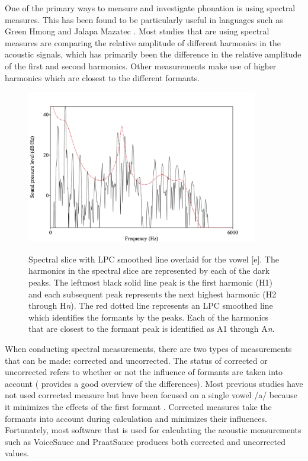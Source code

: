 \documentclass[12pt, letterpaper]{article}
\begin{document}
One of the primary ways to measure and investigate phonation is using spectral measures. This has been found to be particularly useful in languages such as Green Hmong \citep{huffmanMeasuresPhonationType1987,andruskiPhonationTypesProduction2000} and Jalapa Mazatec \citep{silvermanPhoneticStructuresJalapa1995,blankenshipTimeCourseBreathiness1997}. Most studies that are using spectral measures are comparing the relative amplitude of different harmonics in the acoustic signals, which has primarily been the difference in the relative amplitude of the first and second harmonics. Other measurements make use of higher harmonics which are closest to the different formants. 
\begin{figure}[!ht]
	\centering
	\includegraphics[width=0.9\textwidth]{../Harmonics.png}
	\label{fig:Harmonics}
	\caption{Spectral slice with LPC smoothed line overlaid for the vowel [e]. The harmonics in the spectral slice are represented by each of the dark peaks. The leftmost black solid line peak is the first harmonic (H1) and each subsequent peak represents the next highest harmonic (H2 through H\textit{n}). The red dotted line represents an LPC smoothed line which identifies the formants by the peaks. Each of the harmonics that are closest to the formant peak is identified as A1 through A\textit{n}.}
\end{figure}

When conducting spectral measurements, there are two types of measurements that can be made: corrected and uncorrected. The status of corrected or uncorrected refers to whether or not the influence of formants are taken into account (\cite{garellekPhoneticsVoice2019} provides a good overview of the differences). Most previous studies have not used corrected measure but have been focused on a single vowel /a/ because it minimizes the effects of the first formant \citep{espositoVariationContrastivePhonation2010}. Corrected measures take the formants into account during calculation and minimizes their influences. Fortunately, most software that is used for calculating the acoustic measurements such as VoiceSauce \citep{shueVOICESAUCEProgramVoice2009} and PraatSauce \citep{kirbyPraatSauce2022} produces both corrected and uncorrected values. 
\end{document}
